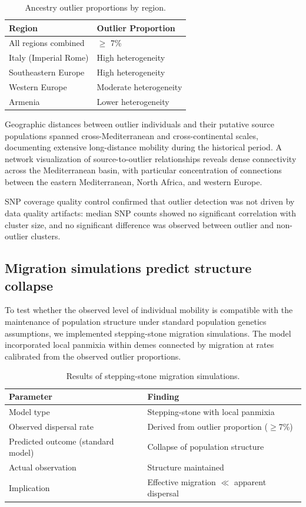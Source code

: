\documentclass[11pt]{article}
\begin{document}
\begin{table}[ht]
\centering
\caption{Ancestry outlier proportions by region.}
\label{tab:outliers}
\begin{tabular}{ll}
\toprule
Region & Outlier Proportion \\
\midrule
All regions combined & $\geq$ 7\% \\
Italy (Imperial Rome) & High heterogeneity \\
Southeastern Europe & High heterogeneity \\
Western Europe & Moderate heterogeneity \\
Armenia & Lower heterogeneity \\
\bottomrule
\end{tabular}
\end{table}

Geographic distances between outlier individuals and their putative source populations spanned cross-Mediterranean and cross-continental scales, documenting extensive long-distance mobility during the historical period. A network visualization of source-to-outlier relationships reveals dense connectivity across the Mediterranean basin, with particular concentration of connections between the eastern Mediterranean, North Africa, and western Europe.

SNP coverage quality control confirmed that outlier detection was not driven by data quality artifacts: median SNP counts showed no significant correlation with cluster size, and no significant difference was observed between outlier and non-outlier clusters.

\subsection{Migration simulations predict structure collapse}

To test whether the observed level of individual mobility is compatible with the maintenance of population structure under standard population genetics assumptions, we implemented stepping-stone migration simulations. The model incorporated local panmixia within demes connected by migration at rates calibrated from the observed outlier proportions.

\begin{table}[ht]
\centering
\caption{Results of stepping-stone migration simulations.}
\label{tab:simulations}
\begin{tabular}{ll}
\toprule
Parameter & Finding \\
\midrule
Model type & Stepping-stone with local panmixia \\
Observed dispersal rate & Derived from outlier proportion ($\geq$7\%) \\
Predicted outcome (standard model) & Collapse of population structure \\
Actual observation & Structure maintained \\
Implication & Effective migration $\ll$ apparent dispersal \\
\bottomrule
\end{tabular}
\end{table}
\end{document}
